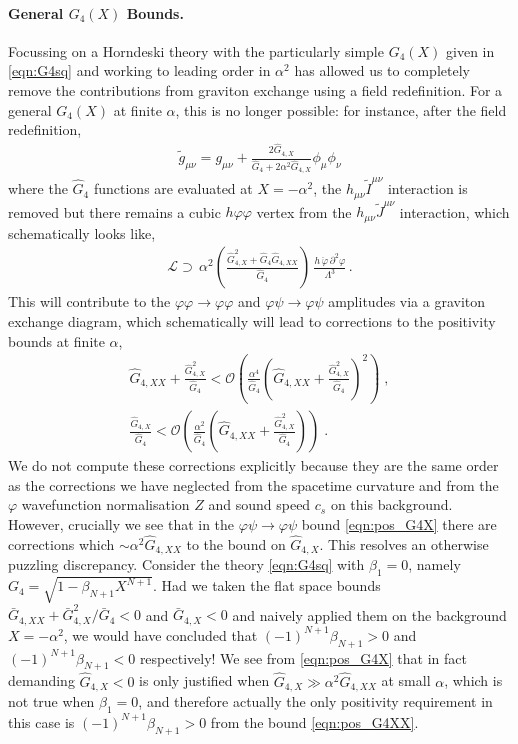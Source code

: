 \documentclass[11pt]{article}
\begin{document}
\paragraph{General $G_4 (X)$ Bounds.}
Focussing on a Horndeski theory with the particularly simple $G_4 (X)$ given in \eqref{eqn:G4sq} and working to leading order in $\alpha^2$ has allowed us to completely remove the contributions from graviton exchange using a field redefinition.
For a general $G_4 (X)$ at finite $\alpha$, this is no longer possible: for instance, after the field redefinition,
\begin{align}
\tilde{g}_{\mu\nu} = g_{\mu\nu} + \frac{2 \hat{G}_{4,X} }{ \hat{G}_4 + 2 \alpha^2 \hat{G}_{4,X}  } \phi_\mu \phi_\nu
\end{align}
where the $\hat{G}_4$ functions are evaluated at $X = -\alpha^2$, the $h_{\mu\nu} \tilde{I}^{\mu\nu}$ interaction is removed but there remains a cubic $h \varphi \varphi$ vertex from the $h_{\mu\nu} \tilde{J}^{\mu\nu}$ interaction, which schematically looks like,
\begin{align}
 \mathcal{L} \supset \,   \alpha^2 \left( \frac{ \hat{G}_{4,X}^2 + \hat{G}_4 \hat{G}_{4,XX}  }{ \hat{G}_4 } \right) \,   \frac{ h \,  \ddot{\varphi} \, \partial^2 \varphi }{ \Lambda^3 }  \,  .
\end{align}
This will contribute to the $\varphi \varphi \to \varphi \varphi$ and $\varphi \psi \to \varphi \psi$ amplitudes via a graviton exchange diagram, which schematically will lead to corrections to the positivity bounds at finite $\alpha$,
\begin{align}
 \hat{G}_{4,XX}  +  \frac{ \hat{G}_{4,X}^2 }{ \hat{G}_4 }   <  \mathcal{O} \left(  \frac{ \alpha^4 }{ \hat{G}_4 } \left( \hat{G}_{4,XX}  +  \frac{ \hat{G}_{4,X}^2 }{ \hat{G}_4 }  \right)^2   \right) \; ,
 \label{eqn:pos_G4XX}  \\
 \frac{ \hat{G}_{4,X} }{ \hat{G}_4 }   < \mathcal{O} \left( \frac{\alpha^2}{\hat{G}_4} \left( \hat{G}_{4,XX}  +  \frac{ \hat{G}_{4,X}^2 }{ \hat{G}_4 }  \right) \right) \; . 
 \label{eqn:pos_G4X}
\end{align}
We do not compute these corrections explicitly because they are the same order as the corrections we have neglected from the spacetime curvature and from the $\varphi$ wavefunction normalisation $Z$ and sound speed $c_s$ on this background. 
However, crucially we see that in the $\varphi \psi \to \varphi \psi$ bound \eqref{eqn:pos_G4X} there are corrections which $\sim \alpha^2 \hat{G}_{4,XX}$ to the bound on $\hat{G}_{4,X}$. 
This resolves an otherwise puzzling discrepancy. Consider the theory \eqref{eqn:G4sq} with $\beta_1 = 0$, namely $G_4 = \sqrt{1- \beta_{N+1} X^{N+1}}$. 
Had we taken the flat space bounds $\bar{G}_{4,XX} + \bar{G}_{4,X}^2/\bar{G}_4 < 0$ and $\bar{G}_{4,X} < 0$ and naively applied them on the background $X= - \alpha^2$, we would have concluded that $(- 1)^{N+1} \beta_{N+1} > 0$ and $(- 1)^{N+1} \beta_{N+1} < 0$ respectively! We see from \eqref{eqn:pos_G4X} that in fact demanding $\hat{G}_{4,X} < 0$ is only justified when $\hat{G}_{4,X} \gg  \alpha^2 \hat{G}_{4,XX}$ at small $\alpha$, which is not true when $\beta_1 = 0$, and therefore actually the only positivity requirement in this case is $(- 1)^{N+1} \beta_{N+1} > 0$ from the bound \eqref{eqn:pos_G4XX}.  
\end{document}
